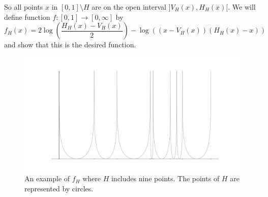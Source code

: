 \documentclass[a4paper,12pt,twoside,BCOR=10mm]{scrbook}
\theoremstyle{definition}
\theoremstyle{definition}
\theoremstyle{definition}
\begin{document}
So all points $x$ in $[0, 1] \setminus H$ are on the open interval $]V_H(x), H_H(x)[$.
We will define function $f: [0, 1] \rightarrow [0, \infty]$ by
\[
	f_H(x) = 2\log \left ( \frac{H_H(x) - V_H(x)}{2} \right ) - \log((x - V_H(x))(H_H(x) - x))
\]
and show that this is the desired function.
\begin{figure}[h]
\centering
\includegraphics[width=1\textwidth]{graph8}
\caption{An example of $f_H$ where $H$ includes nine points. The points of $H$ are represented by circles. }
\end{figure}
\end{document}
